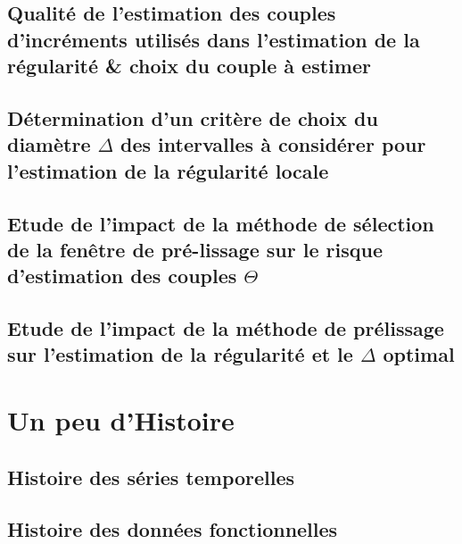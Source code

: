 \section{Qualité de l'estimation des couples d'incréments utilisés dans l'estimation de la régularité \& choix du couple à estimer}
\label{annexe:choix_risque_couple}


\section{Détermination d'un critère de choix du diamètre $\Delta$ des intervalles à considérer pour l'estimation de la régularité locale}



\section{Etude de l'impact de la méthode de sélection de la fenêtre de pré-lissage sur le risque d'estimation des couples $\Theta$}





\section{Etude de l'impact de la méthode de prélissage sur l'estimation de la régularité et le $\Delta$ optimal}
\label{annexe:prelissage_impact}



\chapter{Un peu d'Histoire}
\label{annexe:histoire}
\section{ Histoire des séries temporelles }

\pagebreak
\section{ Histoire des données fonctionnelles }

\pagebreak
